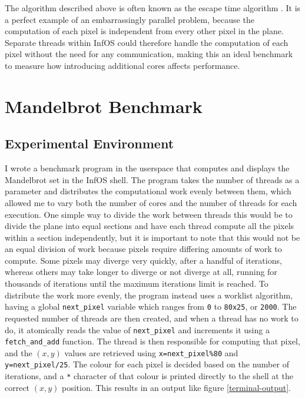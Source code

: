 \documentclass[bsc,frontabs,singlespacing,parskip,deptreport]{infthesis}
\begin{document}
The algorithm described above is often known as the escape time algorithm \cite{mandelbrot-plotting-algorithms}. It is a perfect example of an embarrassingly parallel problem, because the computation of each pixel is independent from every other pixel in the plane. Separate threads within InfOS could therefore handle the computation of each pixel without the need for any communication, making this an ideal benchmark to measure how introducing additional cores affects performance.

\section{Mandelbrot Benchmark} \label{mb-benchmark}
\subsection{Experimental Environment} 
I wrote a benchmark program in the userspace that computes and displays the Mandelbrot set in the InfOS shell. The program takes the number of threads as a parameter and distributes the computational work evenly between them, which allowed me to vary both the number of cores and the number of threads for each execution. One simple way to divide the work between threads this would be to divide the plane into equal sections and have each thread compute all the pixels within a section independently, but it is important to note that this would not be an equal division of work because pixels require differing amounts of work to compute. Some pixels may diverge very quickly, after a handful of iterations, whereas others may take longer to diverge or not diverge at all, running for thousands of iterations until the maximum iterations limit is reached. To distribute the work more evenly, the program instead uses a worklist algorithm, having a global \verb|next_pixel| variable which ranges from \verb|0| to \verb|80x25|, or \verb|2000|. The requested number of threads are then created, and when a thread has no work to do, it atomically reads the value of \verb|next_pixel| and increments it using a \verb|fetch_and_add| function. The thread is then responsible for computing that pixel, and the $(x,y)$ values are retrieved using \verb|x=next_pixel%80| and \verb|y=next_pixel/25|. The colour for each pixel is decided based on the number of iterations, and a \verb|*| character of that colour is printed directly to the shell at the correct $(x,y)$ position. This results in an output like figure \ref{terminal-output}.
\end{document}

